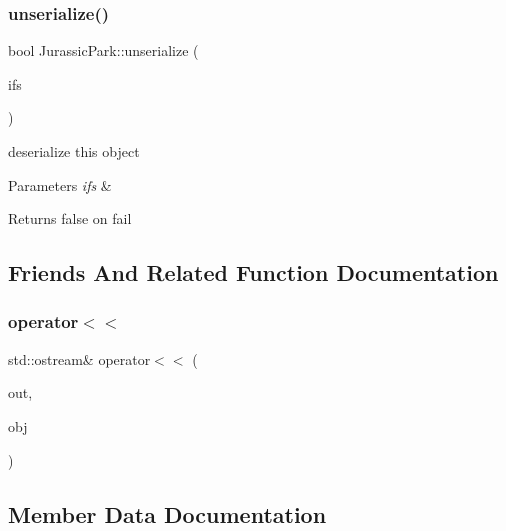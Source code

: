 \subsubsection{\texorpdfstring{unserialize()}{unserialize()}}
{\footnotesize\ttfamily bool Jurassic\+Park\+::unserialize (\begin{DoxyParamCaption}\item[{std\+::ifstream \&}]{ifs }\end{DoxyParamCaption})}

deserialize this object 
\begin{DoxyParams}{Parameters}
{\em ifs} & \\
\hline
\end{DoxyParams}
\begin{DoxyReturn}{Returns}
false on fail 
\end{DoxyReturn}


\subsection{Friends And Related Function Documentation}
\mbox{\label{classJurassicPark_a6f52feef02787591567009e3e5d18bd9}} 
\subsubsection{\texorpdfstring{operator$<$$<$}{operator<<}}
{\footnotesize\ttfamily std\+::ostream\& operator$<$$<$ (\begin{DoxyParamCaption}\item[{std\+::ostream \&}]{out,  }\item[{\hyperlink{classJurassicPark}{Jurassic\+Park} const \&}]{obj }\end{DoxyParamCaption})\hspace{0.3cm}{\ttfamily [friend]}}



\subsection{Member Data Documentation}
\mbox{\label{classJurassicPark_a0997428c12ee5be9fb69c87415cab85b}} 
